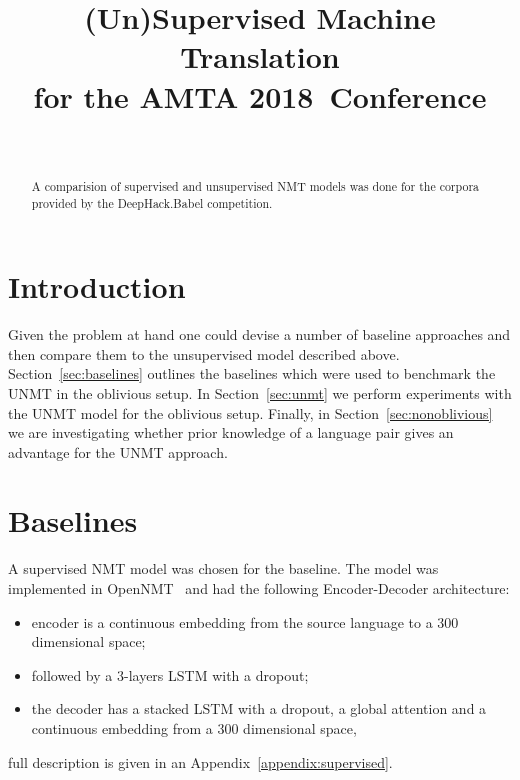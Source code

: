 \documentclass[]{article}
\newcommand{\confname}{AMTA 2018}
\begin{document}
\title{\bf (Un)Supervised Machine Translation \\
  for the \confname~Conference}
\author{ \hfill  {}\\
\AND
         \hfill {}
}

\maketitle
\pagestyle{empty}

\begin{abstract}
  A comparision of supervised and unsupervised NMT models was done for the corpora provided by the DeepHack.Babel competition.
\end{abstract}

\section{Introduction}


Given the problem at hand one could devise a number of baseline approaches and then compare them to the unsupervised model described above.
Section~\ref{sec:baselines} outlines the baselines which were used to benchmark the UNMT in the oblivious setup.
In Section~\ref{sec:unmt} we perform experiments with the UNMT model for the oblivious setup.
Finally, in Section~\ref{sec:nonoblivious} we are investigating whether prior knowledge of a language pair gives an advantage for the UNMT approach.

\section{Baselines}
\label{sect:baselines}

A supervised NMT model was chosen for the baseline.
The model was implemented in OpenNMT~\cite{opennmt} and had the following Encoder-Decoder architecture:
\begin{itemize}
\item encoder is a continuous embedding from the source language to a $300$ dimensional space;
\item followed by a $3$-layers LSTM with a dropout;
\item the decoder has a stacked LSTM with a dropout, a global attention \cite{bahdanau2014neural} and a continuous embedding from a $300$ dimensional space,
\end{itemize}
full description is given in an Appendix~\ref{appendix:supervised}.
\end{document}
